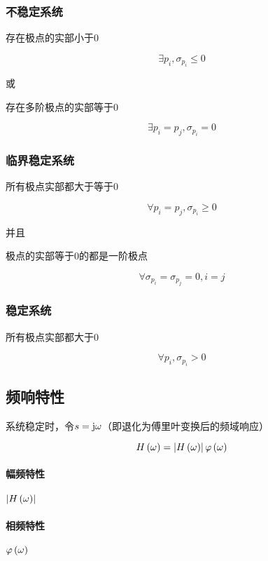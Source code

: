 \documentclass{article}
\begin{document}
\subsubsection{不稳定系统}

存在极点的实部小于0

\[\exists p_i,\sigma_{p_i}\leqslant0\]

或

存在多阶极点的实部等于0

\[\exists p_i=p_j,\sigma_{p_i}=0\]

\subsubsection{临界稳定系统}

所有极点实部都大于等于0

\[\forall p_i=p_j,\sigma_{p_i}\geqslant0\]

并且

极点的实部等于0的都是一阶极点

\[\forall \sigma_{p_i}=\sigma_{p_j}=0,i=j\]

\subsubsection{稳定系统}

所有极点实部都大于0

\[\forall p_i,\sigma_{p_i}>0\]

\subsection{频响特性}

系统稳定时，令$s=\mathrm j\omega$（即退化为傅里叶变换后的频域响应）

\[H\left(\omega\right)=\left|H\left(\omega\right)\right|\varphi\left(\omega\right)\]

\paragraph{幅频特性}$\left|H\left(\omega\right)\right|$

\paragraph{相频特性}$\varphi\left(\omega\right)$
\end{document}
